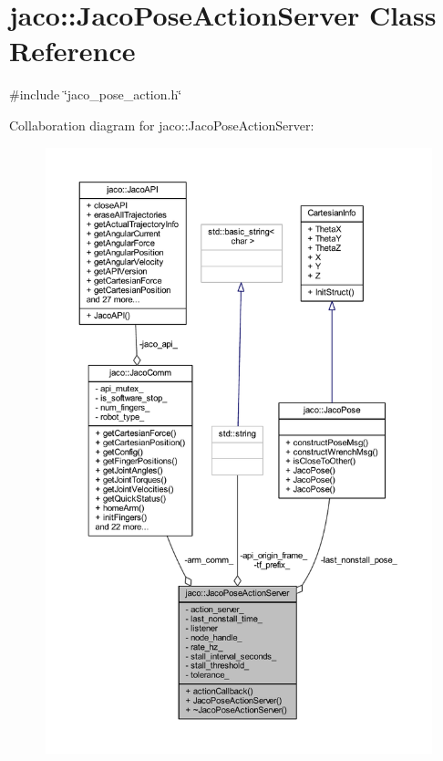 \hypertarget{classjaco_1_1JacoPoseActionServer}{}\section{jaco\+:\+:Jaco\+Pose\+Action\+Server Class Reference}
\label{classjaco_1_1JacoPoseActionServer}


{\ttfamily \#include \char`\"{}jaco\+\_\+pose\+\_\+action.\+h\char`\"{}}



Collaboration diagram for jaco\+:\+:Jaco\+Pose\+Action\+Server\+:
\nopagebreak
\begin{figure}[H]
\begin{center}
\leavevmode
\includegraphics[width=350pt]{d9/de2/classjaco_1_1JacoPoseActionServer__coll__graph}
\end{center}
\end{figure}
